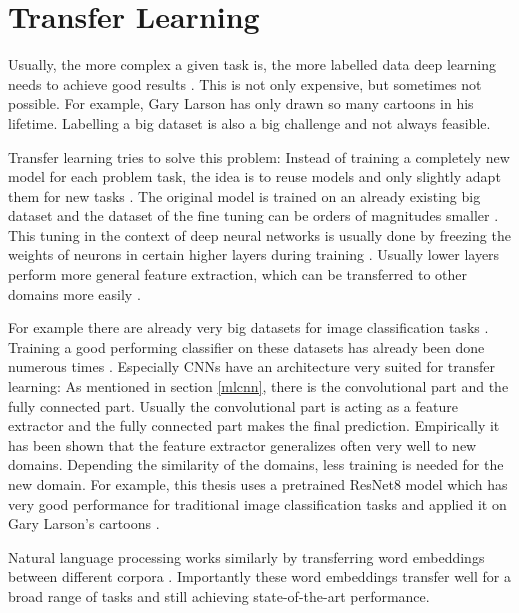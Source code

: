\documentclass[draft,final,oneside]{vutinfth} %
\begin{document}
\fi


\section{Transfer Learning} \label{transferlearning}

Usually, the more complex a given task is, the more labelled data deep learning needs to achieve good results \cite{Goodfellow-et-al-2016}. This is not only expensive, but sometimes not possible. For example, Gary Larson has only drawn so many cartoons in his lifetime. Labelling a big dataset is also a big challenge and not always feasible.

Transfer learning tries to solve this problem: Instead of training a completely new model for each problem task, the idea is to reuse models and only slightly adapt them for new tasks \cite{Goodfellow-et-al-2016}. The original model is trained on an already existing big dataset and the dataset of the fine tuning can be orders of magnitudes smaller \cite{dlvc}. This tuning in the context of deep neural networks is usually done by freezing the weights of neurons in certain higher layers during training \cite{Goodfellow-et-al-2016}. Usually lower layers perform more general feature extraction, which can be transferred to other domains more easily \cite{dlvc}.

For example there are already very big datasets for image classification tasks \cite{alexnet}. Training a good performing classifier on these datasets has already been done numerous times \cite{resnet}\cite{alexnet}. Especially CNNs have an architecture very suited for transfer learning: As mentioned in section \ref{mlcnn}, there is the convolutional part and the fully connected part. Usually the convolutional part is acting as a feature extractor and the fully connected part makes the final prediction. Empirically it has been shown that the feature extractor generalizes often very well to new domains. Depending the similarity of the domains, less training is needed for the new domain. For example, this thesis uses a pretrained ResNet8 model which has very good performance for traditional image classification tasks and applied it on Gary Larson's cartoons \cite{resnet}.

Natural language processing works similarly by transferring word embeddings between different corpora \cite{bert}. Importantly these word embeddings transfer well for a broad range of tasks and still achieving state-of-the-art performance. \cite{elmo}
\end{document}
